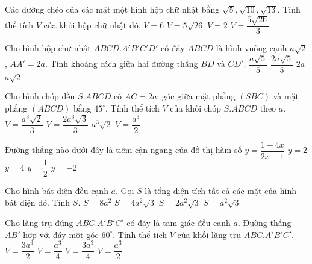\begin{ex}%
Các đường chéo của các mặt một hình hộp chữ nhật bằng $\sqrt{5}, \sqrt{10}, \sqrt{13}$. Tính thể tích $V$ của khối hộp chữ nhật đó.
\choice
{\True $V=6$}
{$V=5\sqrt{26}$}
{$V=2$}
{$V=\dfrac{5\sqrt{26}}{3}$}
\end{ex}
\begin{ex}%
Cho hình hộp chữ nhật $ABCD.A'B'C'D'$ có đáy $ABCD$ là hình vuông cạnh $a\sqrt{2}$, $AA'=2a$. Tính khoảng cách giữa hai đường thẳng $BD$ và $CD'$.
\choice
{$\dfrac{a\sqrt{5}}{5}$}
{\True $\dfrac{2a\sqrt{5}}{5}$}
{$2a$}
{$a\sqrt{2}$}
\end{ex}
\begin{ex}%
Cho hình chóp đều $S.ABCD$ có $AC=2a$; góc giữa mặt phẳng $(SBC)$ và mặt phẳng $(ABCD)$ bằng $45^{\circ}$. Tính thể tích $V$ của khối chóp $S.ABCD$ theo $a$.
\choice
{\True $V=\dfrac{a^3\sqrt{2}}{3}$}
{$V=\dfrac{2a^3\sqrt{3}}{3}$}
{$a^3\sqrt{2}$}
{$V=\dfrac{a^3}{2}$}
\end{ex}
\begin{ex}%
Đường thẳng nào dưới đây là tiệm cận ngang của đồ thị hàm số $y=\dfrac{1-4x}{2x-1}$
\choice
{$y=2$}
{$y=4$}
{$y=\dfrac{1}{2}$}
{\True $y=-2$}
\end{ex}
\begin{ex}%
Cho hình bát diện đều cạnh $a$. Gọi $S$ là tổng diện tích tất cả các mặt của hình bát diện đó. Tính $S$.
\choice
{$S=8a^2$}
{$S=4a^2\sqrt{3}$}
{\True $S=2a^2\sqrt{3}$}
{$S=a^2\sqrt{3}$}
\end{ex}
\begin{ex}%
Cho lăng trụ đứng $ABC.A'B'C'$ có đáy là tam giác đều cạnh $a$. Đường thẳng $AB'$ hợp với đáy một góc $60^{\circ}$. Tính thể tích $V$ của khối lăng trụ $ABC.A'B'C'$.
\choice
{$V=\dfrac{3a^3}{2}$}
{$V=\dfrac{a^3}{4}$}
{\True $V=\dfrac{3a^3}{4}$}
{$V=\dfrac{a^3}{2}$}
\end{ex}
